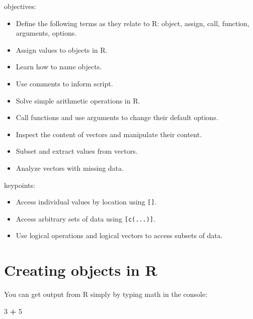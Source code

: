 \documentclass[]{book}
\newenvironment{Shaded}{\begin{snugshade}}{\end{snugshade}}
\newcommand{\DecValTok}[1]{\textcolor[rgb]{0.00,0.00,0.81}{#1}}
\newcommand{\StringTok}[1]{\textcolor[rgb]{0.31,0.60,0.02}{#1}}
\newcommand{\OperatorTok}[1]{\textcolor[rgb]{0.81,0.36,0.00}{\textbf{#1}}}
\providecommand{\tightlist}{%
  \setlength{\itemsep}{0pt}\setlength{\parskip}{0pt}}
\begin{document}
objectives:

\begin{itemize}
\tightlist
\item
  Define the following terms as they relate to R: object, assign, call,
  function, arguments, options.\\
\item
  Assign values to objects in R.\\
\item
  Learn how to name objects.\\
\item
  Use comments to inform script.\\
\item
  Solve simple arithmetic operations in R.\\
\item
  Call functions and use arguments to change their default options.\\
\item
  Inspect the content of vectors and manipulate their content.\\
\item
  Subset and extract values from vectors.\\
\item
  Analyze vectors with missing data.
\end{itemize}

keypoints:

\begin{itemize}
\tightlist
\item
  Access individual values by location using \texttt{{[}{]}}.\\
\item
  Access arbitrary sets of data using \texttt{{[}c(...){]}}.\\
\item
  Use logical operations and logical vectors to access subsets of data.
\end{itemize}

\section{Creating objects in R}\label{creating-objects-in-r}

You can get output from R simply by typing math in the console:

\begin{Shaded}
\begin{Highlighting}[]
\DecValTok{3} \OperatorTok{+}\StringTok{ }\DecValTok{5}
\end{Highlighting}
\end{Shaded}
\end{document}

